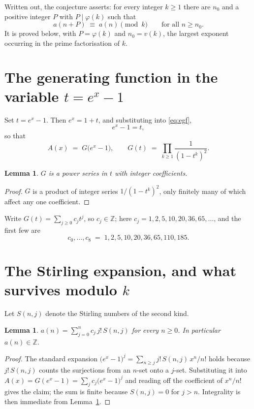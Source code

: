 \documentclass[11pt,a4paper]{article}
\theoremstyle{plain}
\newtheorem{lemma}[theorem]{Lemma}
\theoremstyle{definition}
\begin{document}
Written out, the conjecture asserts: for every integer $k\ge 1$ there are $n_0$ and a
positive integer $P$ with $P\mid\varphi(k)$ such that
\begin{equation}\label{eq:conj}
a(n+P)\;\equiv\;a(n)\pmod{k}\qquad\text{for all } n\ge n_0 .
\end{equation}
It is proved below, with $P=\varphi(k)$ and $n_0=v(k)$, the largest exponent occurring in
the prime factorisation of $k$.

\section{The generating function in the variable $t=e^{x}-1$}

Set $t=e^{x}-1$. Then $e^{x}=1+t$, and substituting into \eqref{eq:egf},
\[
e^{x}-1=t,
\]
so that
\begin{equation}\label{eq:G}
A(x)\;=\;G\bigl(e^{x}-1\bigr),\qquad
G(t)\;=\;\prod_{k\ge 1}\frac{1}{(1-t^{k})^{2}}.
\end{equation}

\begin{lemma}\label{lem:int}
$G$ is a power series in $t$ with integer coefficients.
\end{lemma}

\begin{proof}
$G$ is a product of integer series $1/(1-t^{k})^{2}$, only finitely many of which affect any one coefficient.
\end{proof}

Write $G(t)=\sum_{j\ge0}c_j t^{j}$, so $c_j\in\mathbb{Z}$; here $c_j = 1, 2, 5, 10, 20, 36, 65, \dots$, and the
first few are
\[
c_0,\dots,c_8 \;=\; 1, 2, 5, 10, 20, 36, 65, 110, 185.
\]

\section{The Stirling expansion, and what survives modulo $k$}

Let $S(n,j)$ denote the Stirling numbers of the second kind.

\begin{lemma}\label{lem:stir}
$a(n)=\sum_{j=0}^{n} c_j\, j!\, S(n,j)$ for every $n\ge 0$. In particular $a(n)\in\mathbb{Z}$.
\end{lemma}

\begin{proof}
The standard expansion $\bigl(e^{x}-1\bigr)^{j}
=\sum_{n\ge j} j!\,S(n,j)\,x^{n}/n!$ holds because $j!\,S(n,j)$ counts the surjections
from an $n$-set onto a $j$-set. Substituting it into
$A(x)=G(e^{x}-1)=\sum_j c_j\bigl(e^{x}-1\bigr)^{j}$ and reading off the coefficient of
$x^{n}/n!$ gives the claim; the sum is finite because $S(n,j)=0$ for $j>n$. Integrality is
then immediate from Lemma~\ref{lem:int}.
\end{proof}
\end{document}

